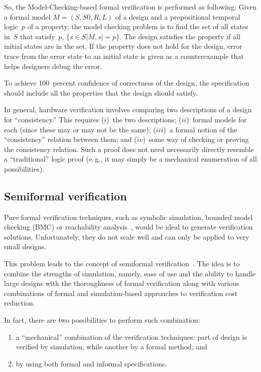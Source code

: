 \begin{multicols}{2}
So, the Model-Checking-based formal verification is performed as following: Given a formal 
model $M = (S, S0, R, L)$ of a design and a propositional temporal logic~$p$ of a 
property, the model checking problem is to find the set of all states in~$S$ that satisfy~$p$, $\{s \in 
S \vert M, s \vert= p\}$. The design satisfies the property if all initial states are in the set. If the 
property does not hold for the design, error trace from the error state to an initial state is given as 
a counterexample that helps designers debug the error. 
       
       To achieve 100~percent confidence of correctness of the design, the specification should 
include all the properties that the design should satisfy. 

In general, hardware verification involves comparing two descriptions of a design for 
``consistency.'' This requires ($i$)~the two descriptions; ($ii$)~formal models for each (since these 
may or may not be the same); ($iii$)~a formal notion of the ``consistency'' relation between them; and
($i\nu$)~some way of checking or proving the consistency relation. Such a proof does not need 
necessarily directly resemble a ``traditional'' logic proof (e.\,g., it may simply be a 
mechanical enumeration of all possibilities). 

\subsection{Semiformal verification} %

\noindent
Pure formal verification techniques, such as symbolic simulation, bounded model checking 
(BMC) or reachability analysis~\cite{1fr, 3fr}, would be ideal to generate verification solutions. 
Unfortunately, they do not scale well and can only be applied to very small designs. 
   
   This problem leads to the concept of semiformal verification~\cite{3fr}. The idea is to 
combine the strengths of simulation, namely, ease of use and the ability to handle large designs 
with the thoroughness of formal verification along with various combinations of formal and 
simulation-based approaches to verification cost reduction. 
   
   In fact, there are two possibilities to perform such combination:
   \begin{enumerate}[(1)]
\item a ``mechanical'' combination of the verification techniques: part of design is verified by 
simulation, while another by a formal method; and
\item  by using both formal and informal specifications.  
\end{enumerate}


\end{multicols}
